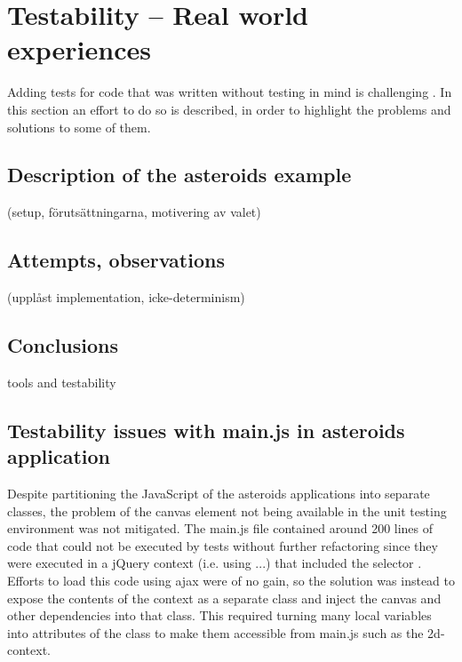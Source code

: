 \documentclass[11pt]{article}
\begin{document}
\section{Testability -- Real world experiences}

Adding tests for code that was written without testing in mind is challenging \cite[p.~18]{Tddjs}. In this section an effort to do so is described, in order to highlight the problems and solutions to some of them.

\subsection{Description of the asteroids example}

(setup, förutsättningarna, motivering av valet)

\subsection{Attempts, observations}

(upplåst implementation, icke-determinism)

\subsection{Conclusions}

tools and testability

\subsection{Testability issues with main.js in asteroids application}
\label{sec:asteroids}

Despite partitioning the JavaScript of the asteroids applications into separate classes, the problem of the canvas element not being available in the unit testing environment was not mitigated. The main.js file contained around 200 lines of code that could not be executed by tests without further refactoring since they were executed in a jQuery context (i.e. using \jquerycontext...) that included the selector \selector. Efforts to load this code using ajax were of no gain, so the solution was instead to expose the contents of the context as a separate class and inject the canvas and other dependencies into that class. This required turning many local variables into attributes of the class to make them accessible from main.js such as the 2d-context.
\end{document}
